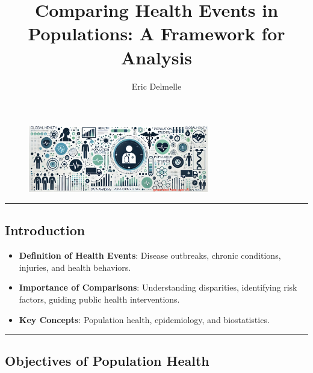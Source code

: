 \documentclass[
  letterpaper,
  DIV=11,
  numbers=noendperiod]{scrartcl}
\title{Comparing Health Events in Populations: A Framework for Analysis}
\author{Eric Delmelle}
\date{}
\providecommand{\tightlist}{%
  \setlength{\itemsep}{0pt}\setlength{\parskip}{0pt}}\usepackage{longtable,booktabs,array}
\begin{document}
\maketitle
\ifdefined\Shaded\renewenvironment{Shaded}{\begin{tcolorbox}[breakable, interior hidden, enhanced, boxrule=0pt, sharp corners, borderline west={3pt}{0pt}{shadecolor}, frame hidden]}{\end{tcolorbox}}\fi

\begin{figure}

{\centering \includegraphics[width=0.7\textwidth,height=\textheight]{week2_files/imgs/banner.jpg}

}

\end{figure}

\begin{center}\rule{0.5\linewidth}{0.5pt}\end{center}

\hypertarget{introduction}{%
\subsection{\texorpdfstring{{\textbf{Introduction}}}{Introduction}}\label{introduction}}

\begin{itemize}
\tightlist
\item
  \textbf{Definition of Health Events}: Disease outbreaks, chronic
  conditions, injuries, and health behaviors.
\item
  \textbf{Importance of Comparisons}: Understanding disparities,
  identifying risk factors, guiding public health interventions.
\item
  \textbf{Key Concepts}: Population health, epidemiology, and
  biostatistics.
\end{itemize}

\begin{center}\rule{0.5\linewidth}{0.5pt}\end{center}

\hypertarget{objectives-of-population-health}{%
\subsection{\texorpdfstring{{\textbf{Objectives of Population
Health}}}{Objectives of Population Health}}\label{objectives-of-population-health}}
\end{document}
